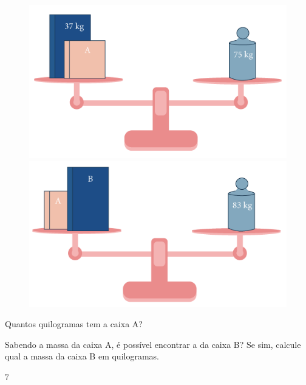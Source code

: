 \begin{figure}[htpb!]
\includegraphics[width=.5\textwidth]{../ilustracoes/MAT5/SAEB_5ANO_MAT_figura20a.png}
\includegraphics[width=.5\textwidth]{../ilustracoes/MAT5/SAEB_5ANO_MAT_figura20b.png}
\end{figure}

\begin{escolha}
\item Quantos quilogramas tem a caixa A?

\bigskip
\bigskip
\bigskip

\item Sabendo a massa da caixa A, é possível encontrar a da caixa B? Se sim,
  calcule qual a massa da caixa B em quilogramas.

\end{escolha}

\num{7}

